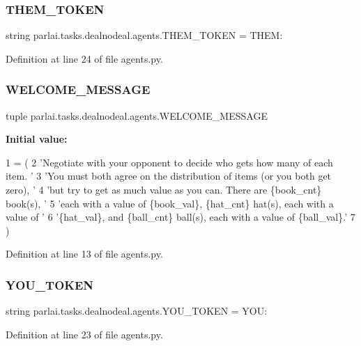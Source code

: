 \subsubsection{\texorpdfstring{T\+H\+E\+M\+\_\+\+T\+O\+K\+EN}{THEM\_TOKEN}}
{\footnotesize\ttfamily string parlai.\+tasks.\+dealnodeal.\+agents.\+T\+H\+E\+M\+\_\+\+T\+O\+K\+EN = \textquotesingle{}T\+H\+E\+M\+:\textquotesingle{}}



Definition at line 24 of file agents.\+py.

\mbox{\label{namespaceparlai_1_1tasks_1_1dealnodeal_1_1agents_a1fee23e402c5fa284bb652c46941a65f}} 
\subsubsection{\texorpdfstring{W\+E\+L\+C\+O\+M\+E\+\_\+\+M\+E\+S\+S\+A\+GE}{WELCOME\_MESSAGE}}
{\footnotesize\ttfamily tuple parlai.\+tasks.\+dealnodeal.\+agents.\+W\+E\+L\+C\+O\+M\+E\+\_\+\+M\+E\+S\+S\+A\+GE}

{\bfseries Initial value\+:}
\begin{DoxyCode}
1 =  (
2     \textcolor{stringliteral}{'Negotiate with your opponent to decide who gets how many of each item. '}
3     \textcolor{stringliteral}{'You must both agree on the distribution of items (or you both get zero), '}
4     \textcolor{stringliteral}{'but try to get as much value as you can. There are \{book\_cnt\} book(s), '}
5     \textcolor{stringliteral}{'each with a value of \{book\_val\}, \{hat\_cnt\} hat(s), each with a value of '}
6     \textcolor{stringliteral}{'\{hat\_val\}, and \{ball\_cnt\} ball(s), each with a value of \{ball\_val\}.'}
7 )
\end{DoxyCode}


Definition at line 13 of file agents.\+py.

\mbox{\label{namespaceparlai_1_1tasks_1_1dealnodeal_1_1agents_a3065976d735a2293eed1605b579871ef}} 
\subsubsection{\texorpdfstring{Y\+O\+U\+\_\+\+T\+O\+K\+EN}{YOU\_TOKEN}}
{\footnotesize\ttfamily string parlai.\+tasks.\+dealnodeal.\+agents.\+Y\+O\+U\+\_\+\+T\+O\+K\+EN = \textquotesingle{}Y\+O\+U\+:\textquotesingle{}}



Definition at line 23 of file agents.\+py.


